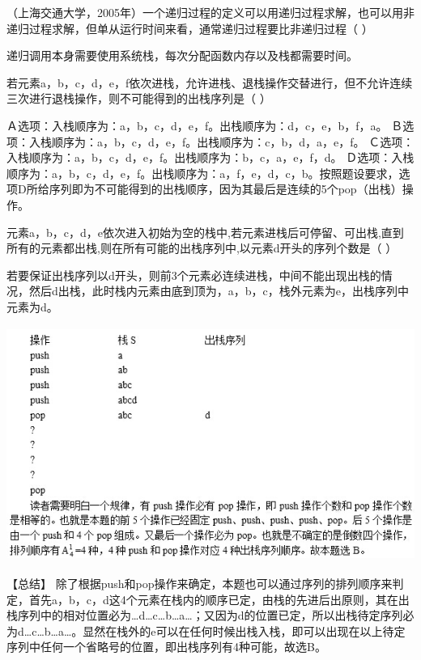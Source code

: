 \question （上海交通大学，2005年）一个递归过程的定义可以用递归过程求解，也可以用非递归过程求解，但单从运行时间来看，通常递归过程要比非递归过程（
）
\par{}
\begin{solution}递归调用本身需要使用系统栈，每次分配函数内存以及栈都需要时间。
\end{solution}
\question 若元素a，b，c，d，e，f依次进栈，允许进栈、退栈操作交替进行，但不允许连续三次进行退栈操作，则不可能得到的出栈序列是（
）
\par{}
\begin{solution}Ａ选项：入栈顺序为：a，b，c，d，e，f。出栈顺序为：d，c，e，b，f，a。
Ｂ选项：入栈顺序为：a，b，c，d，e，f。出栈顺序为：c，b，d，a，e，f。
Ｃ选项：入栈顺序为：a，b，c，d，e，f。出栈顺序为：b，c，a，e，f，d。
Ｄ选项：入栈顺序为：a，b，c，d，e，f。出栈顺序为：a，f，e，d，c，b。按照题设要求，选项D所给序列即为不可能得到的出栈顺序，因为其最后是连续的5个pop（出栈）操作。
\end{solution}
\question 元素a，b，c，d，e依次进入初始为空的栈中,若元素进栈后可停留、可出栈,直到所有的元素都出栈,则在所有可能的出栈序列中,以元素d开头的序列个数是（
）
\par{}
\begin{solution}若要保证出栈序列以d开头，则前3个元素必连续进栈，中间不能出现出栈的情况，然后d出栈，此时栈内元素由底到顶为，a，b，c，栈外元素为e，出栈序列中元素为d。
\includegraphics[width=5.90625in,height=3.31250in]{computerassets/e6ce6cda40e4109f129b7eaf9d62c8e2.jpeg}
【总结】
除了根据push和pop操作来确定，本题也可以通过序列的排列顺序来判定，首先a，b，c，d这4个元素在栈内的顺序已定，由栈的先进后出原则，其在出栈序列中的相对位置必为\ldots{}d\ldots{}c\ldots{}b\ldots{}a\ldots{}；又因为d的位置已定，所以出栈待定序列必为d\ldots{}c\ldots{}b\ldots{}a\ldots{}。显然在栈外的e可以在任何时候出栈入栈，即可以出现在以上待定序列中任何一个省略号的位置，即出栈序列有4种可能，故选B。
\end{solution}
